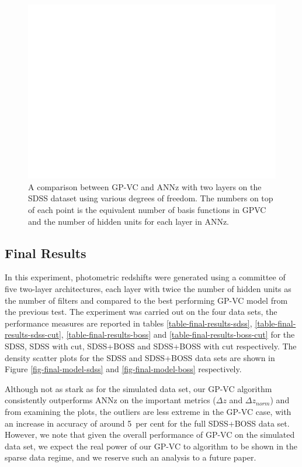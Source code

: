 \documentclass[useAMS,usenatbib,fleqn]{mn2e}
\begin{document}
\begin{figure}
	\centering
	\includegraphics[width=\columnwidth]{figures/sdss_final}
	\caption{A comparison between GP-VC and {\sc ANNz} with two layers on the SDSS dataset using various degrees of freedom. The numbers on top of each point is the equivalent number of basis functions in GPVC and the number of hidden units for each layer in {\sc ANNz}.}
	\label{fig-ann-gpvc-sdss}
\end{figure}

\subsection{Final Results}

In this experiment, photometric redshifts were generated using a committee of five two-layer architectures, each layer with twice the number of hidden units as the number of filters and compared to the best performing GP-VC model from the previous test. The experiment was carried out on the four data sets, the performance measures are reported in tables \ref{table-final-results-sdss}, \ref{table-final-results-sdss-cut}, \ref{table-final-results-boss} and \ref{table-final-results-boss-cut} for the SDSS, SDSS with cut, SDSS+BOSS and SDSS+BOSS with cut respectively. The density scatter plots for the SDSS and SDSS+BOSS data sets are shown in Figure \ref{fig-final-model-sdss} and \ref{fig-final-model-boss} respectively. 

Although not as stark as for the simulated data set, our GP-VC algorithm consistently outperforms {\sc ANNz} on the important metrics ($\Delta z$ and $\Delta z_{norm}$) and from examining the plots, the outliers are less extreme in the GP-VC case, with an increase in accuracy of around 5~per cent for the full SDSS+BOSS data set. However, we note that given the overall performance of GP-VC on the simulated data set, we expect the real power of our GP-VC to algorithm to be shown in the sparse data regime, and we reserve such an analysis to a future paper.
\end{document}
